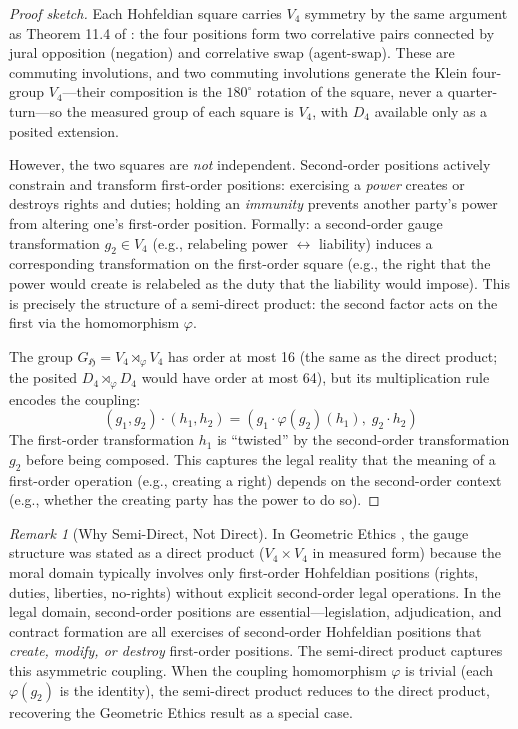 \documentclass[12pt]{article}
\theoremstyle{definition}
\theoremstyle{remark}
\newtheorem{remark}[theorem]{Remark}
\newcommand{\Ho}{\mathfrak{H}}             %
\begin{document}
\begin{proof}[Proof sketch]
Each Hohfeldian square carries $V_4$ symmetry by the same argument as Theorem 11.4 of \cite{bond2026geometric}: the four positions form two correlative pairs connected by jural opposition (negation) and correlative swap (agent-swap).  These are commuting involutions, and two commuting involutions generate the Klein four-group $V_4$---their composition is the $180^\circ$ rotation of the square, never a quarter-turn---so the measured group of each square is $V_4$, with $D_4$ available only as a posited extension.

However, the two squares are \emph{not} independent.  Second-order positions actively constrain and transform first-order positions: exercising a \emph{power} creates or destroys rights and duties; holding an \emph{immunity} prevents another party's power from altering one's first-order position.  Formally: a second-order gauge transformation $g_2 \in V_4$ (e.g., relabeling power $\leftrightarrow$ liability) induces a corresponding transformation on the first-order square (e.g., the right that the power would create is relabeled as the duty that the liability would impose).  This is precisely the structure of a semi-direct product: the second factor acts on the first via the homomorphism $\varphi$.

The group $G_{\Ho} = V_4 \rtimes_\varphi V_4$ has order at most 16 (the same as the direct product; the posited $D_4 \rtimes_\varphi D_4$ would have order at most 64), but its multiplication rule encodes the coupling:
\begin{equation}
(g_1, g_2) \cdot (h_1, h_2) = (g_1 \cdot \varphi(g_2)(h_1),\; g_2 \cdot h_2)
\label{eq:semidirect_mult}
\end{equation}
The first-order transformation $h_1$ is ``twisted'' by the second-order transformation $g_2$ before being composed.  This captures the legal reality that the meaning of a first-order operation (e.g., creating a right) depends on the second-order context (e.g., whether the creating party has the power to do so).
\end{proof}

\begin{remark}[Why Semi-Direct, Not Direct]
In Geometric Ethics \cite{bond2026geometric}, the gauge structure was stated as a direct product ($V_4 \times V_4$ in measured form) because the moral domain typically involves only first-order Hohfeldian positions (rights, duties, liberties, no-rights) without explicit second-order legal operations.  In the legal domain, second-order positions are essential---legislation, adjudication, and contract formation are all exercises of second-order Hohfeldian positions that \emph{create, modify, or destroy} first-order positions.  The semi-direct product captures this asymmetric coupling.  When the coupling homomorphism $\varphi$ is trivial (each $\varphi(g_2)$ is the identity), the semi-direct product reduces to the direct product, recovering the Geometric Ethics result as a special case.
\end{remark}
\end{document}
